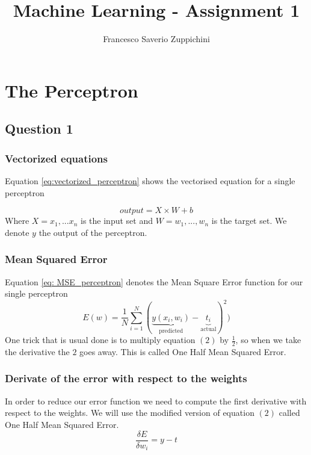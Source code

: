 \documentclass[11pt]{article}
\author{Francesco Saverio Zuppichini}
\title{Machine Learning - Assignment 1}
\begin{document}
\maketitle

\section{The Perceptron}
\subsection{Question 1}
\subsubsection{Vectorized equations}
Equation \ref{eq:vectorized_perceptron} shows the vectorised equation for a single perceptron

\begin{equation}
\label{eq:vectorized_perceptron}
output = X\times W + b
\end{equation}
Where $X = {x_1, ... x_n}$ is the input set and $W = {w_1, ..., w_n}$ is the target set. We denote $y$ the output of the perceptron.

\subsubsection{Mean Squared Error}
Equation \ref{eq: MSE_perceptron} denotes the Mean Square Error function for our single perceptron
\begin{equation}
\label{eq: MSE_perceptron}
	E(w) = \frac{1}{N}\sum_{i = 1}^N(\underbrace{y(x_i,w_i)}_{\text{predicted}} - \underbrace{t_i}_{\text{actual}})^2)
\end{equation}
One trick that is usual done is to multiply equation $(2)$ by $\frac{1}{2}$, so when we take the derivative the $2$ goes away. This is called One Half Mean Squared Error.

\subsubsection{Derivate of the error with respect to the weights}
In order to reduce our error function we need to compute the first derivative with respect to the weights. We will use the modified version of equation $(2)$ called One Half Mean Squared Error.
\begin{equation}
\frac{\delta E}{\delta w_i}	= y - t
\end{equation}
\end{document}
